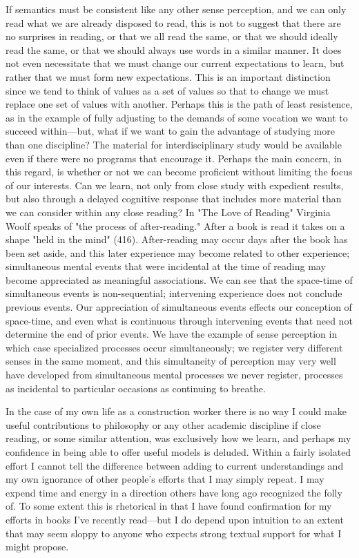 \documentclass[
]{memoir}
\begin{document}
If semantics must be consistent like any other sense perception, and we
can only read what we are already disposed to read, this is not to
suggest that there are no surprises in reading, or that we all read the
same, or that we should ideally read the same, or that we should always
use words in a similar manner. It does not even necessitate that we must
change our current expectations to learn, but rather that we must form
new expectations. This is an important distinction since we tend to
think of values as a set of values so that to change we must replace one
set of values with another. Perhaps this is the path of least
resistence, as in the example of fully adjusting to the demands of some
vocation we want to succeed within---but, what if we want to gain the
advantage of studying more than one discipline? The material for
interdisciplinary study would be available even if there were no
programs that encourage it. Perhaps the main concern, in this regard, is
whether or not we can become proficient without limiting the focus of
our interests. Can we learn, not only from close study with expedient
results, but also through a delayed cognitive response that includes
more material than we can consider within any close reading? In "The
Love of Reading" Virginia Woolf speaks of "the process of
after-reading." After a book is read it takes on a shape "held in the
mind" (416). After-reading may occur days after the book has been set
aside, and this later experience may become related to other experience;
simultaneous mental events that were incidental at the time of reading
may become appreciated as meaningful associations. We can see that the
space-time of simultaneous events is non-sequential; intervening
experience does not conclude previous events. Our appreciation of
simultaneous events effects our conception of space-time, and even what
is continuous through intervening events that need not determine the end
of prior events. We have the example of sense perception in which case
specialized processes occur simultaneously; we register very different
senses in the same moment, and this simultaneity of perception may very
well have developed from simultaneous mental processes we never
register, processes as incidental to particular occasions as continuing
to breathe.

In the case of my own life as a construction worker there is no way I
could make useful contributions to philosophy or any other academic
discipline if close reading, or some similar attention, was exclusively
how we learn, and perhaps my confidence in being able to offer useful
models is deluded. Within a fairly isolated effort I cannot tell the
difference between adding to current understandings and my own ignorance
of other people's efforts that I may simply repeat. I may expend time
and energy in a direction others have long ago recognized the folly of.
To some extent this is rhetorical in that I have found confirmation for
my efforts in books I've recently read---but I do depend upon intuition
to an extent that may seem sloppy to anyone who expects strong textual
support for what I might propose.
\end{document}

